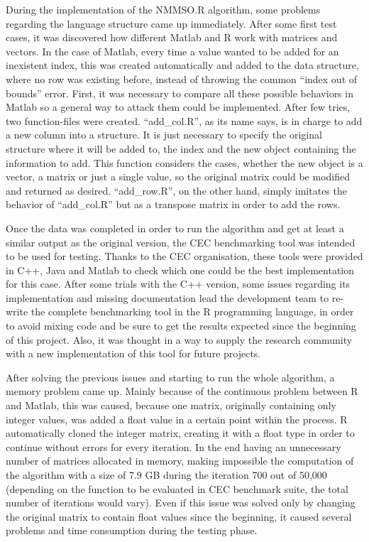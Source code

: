 \documentclass[12pt,a4paper]{article}
\begin{document}
During the implementation of the NMMSO.R algorithm, some problems
regarding the language structure came up immediately. After some first
test cases, it was discovered how different Matlab and R work with
matrices and vectors. In the case of Matlab, every time a value wanted
to be added for an inexistent index, this was created automatically and
added to the data structure, where no row was existing before, instead
of throwing the common ``index out of bounds'' error. First, it was
necessary to compare all these possible behaviors in Matlab so a general
way to attack them could be implemented. After few tries, two
function-files were created. ``add\_col.R'', as its name says, is in
charge to add a new column into a structure. It is just necessary to
specify the original structure where it will be added to, the index and
the new object containing the information to add. This function
considers the cases, whether the new object is a vector, a matrix or
just a single value, so the original matrix could be modified and
returned as desired. ``add\_row.R'', on the other hand, simply imitates
the behavior of ``add\_col.R'' but as a transpose matrix in order to add
the rows.

Once the data was completed in order to run the algorithm and get at
least a similar output as the original version, the CEC benchmarking
tool was intended to be used for testing. Thanks to the CEC
organisation, these tools were provided in C++, Java and Matlab to check
which one could be the best implementation for this case. After some
trials with the C++ version, some issues regarding its implementation
and missing documentation lead the development team to re-write the
complete benchmarking tool in the R programming language, in order to
avoid mixing code and be sure to get the results expected since the
beginning of this project. Also, it was thought in a way to supply the
research community with a new implementation of this tool for future
projects.

After solving the previous issues and starting to run the whole
algorithm, a memory problem came up. Mainly because of the continuous
problem between R and Matlab, this was caused, because one matrix,
originally containing only integer values, was added a float value in a
certain point within the process. R automatically cloned the integer
matrix, creating it with a float type in order to continue without
errors for every iteration. In the end having an unnecessary number of
matrices allocated in memory, making impossible the computation of the
algorithm with a size of 7.9 GB during the iteration 700 out of 50,000
(depending on the function to be evaluated in CEC benchmark suite, the
total number of iterations would vary). Even if this issue was solved
only by changing the original matrix to contain float values since the
beginning, it caused several problems and time consumption during the
testing phase.
\end{document}
